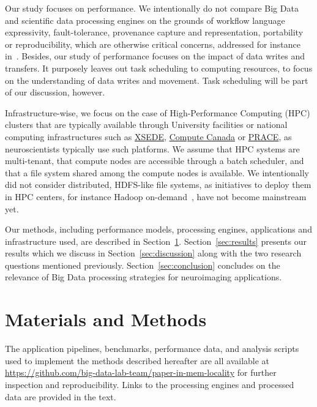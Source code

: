 \documentclass{IEEEtran}
\newcommand{\todo}[1]{\marginpar{\parbox{18mm}{\flushleft\tiny\color{red}\textbf{TODO}:
      #1}}}
\begin{document}
Our study focuses on performance. We intentionally do not 
compare Big Data and scientific data processing engines on the grounds 
of workflow language expressivity, fault-tolerance, provenance capture 
and representation, portability or reproducibility, which are otherwise 
critical concerns, addressed for instance in~\cite{samba}. Besides, our 
study of performance focuses on the impact of data writes and 
transfers. It purposely leaves out task scheduling to computing 
resources, to focus on the understanding of 
data writes and movement. Task scheduling will be part of our 
discussion, however.

Infrastructure-wise, we focus on the case of High-Performance Computing 
(HPC) clusters that are typically available through University 
facilities or national computing infrastructures such as 
\href{xsede.org}{XSEDE}, \href{http://computecanada.ca}{Compute Canada} 
or \href{http://www.prace-ri.eu}{PRACE}, as neuroscientists typically use such platforms.
 We assume that HPC systems are 
multi-tenant, that compute nodes are accessible through a batch 
scheduler, and that a file system shared among the compute nodes is 
available. We intentionally did not consider distributed, 
HDFS-like file systems, as initiatives to deploy them in HPC 
centers, for instance Hadoop on-demand~\cite{krishnan2011myhadoop}, have not 
become mainstream yet.


Our methods, including performance models, processing engines, 
applications and infrastructure used, are described in 
Section~\ref{sec:methods}. Section~\ref{sec:results} presents our 
results which we discuss in Section~\ref{sec:discussion} along with the 
two research questions mentioned previously. 
Section~\ref{sec:conclusion} concludes on the relevance of Big Data 
processing strategies for neuroimaging applications.

\section{Materials and Methods} %
\label{sec:methods}

The application pipelines, benchmarks, performance data, and analysis scripts used 
to implement the methods described hereafter are all available at 
\url{https://github.com/big-data-lab-team/paper-in-mem-locality} for 
further inspection and reproducibility. Links to the processing engines 
and processed data are provided in the text.
\end{document}
